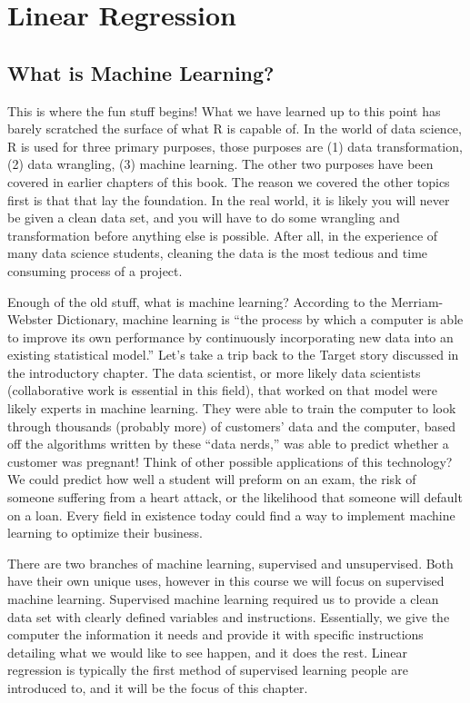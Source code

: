 \documentclass[
]{book}
\begin{document}
\hypertarget{linear-regression}{%
\chapter{Linear Regression}\label{linear-regression}}

\hypertarget{what-is-machine-learning}{%
\section{What is Machine Learning?}\label{what-is-machine-learning}}

This is where the fun stuff begins! What we have learned up to this point has barely scratched the surface of what R is capable of. In the world of data science, R is used for three primary purposes, those purposes are (1) data transformation, (2) data wrangling, (3) machine learning. The other two purposes have been covered in earlier chapters of this book. The reason we covered the other topics first is that that lay the foundation. In the real world, it is likely you will never be given a clean data set, and you will have to do some wrangling and transformation before anything else is possible. After all, in the experience of many data science students, cleaning the data is the most tedious and time consuming process of a project.

Enough of the old stuff, what is machine learning? According to the Merriam-Webster Dictionary, machine learning is ``the process by which a computer is able to improve its own performance by continuously incorporating new data into an existing statistical model.'' Let's take a trip back to the Target story discussed in the introductory chapter. The data scientist, or more likely data scientists (collaborative work is essential in this field), that worked on that model were likely experts in machine learning. They were able to train the computer to look through thousands (probably more) of customers' data and the computer, based off the algorithms written by these ``data nerds,'' was able to predict whether a customer was pregnant! Think of other possible applications of this technology? We could predict how well a student will preform on an exam, the risk of someone suffering from a heart attack, or the likelihood that someone will default on a loan. Every field in existence today could find a way to implement machine learning to optimize their business.

There are two branches of machine learning, supervised and unsupervised. Both have their own unique uses, however in this course we will focus on supervised machine learning. Supervised machine learning required us to provide a clean data set with clearly defined variables and instructions. Essentially, we give the computer the information it needs and provide it with specific instructions detailing what we would like to see happen, and it does the rest. Linear regression is typically the first method of supervised learning people are introduced to, and it will be the focus of this chapter.
\end{document}
